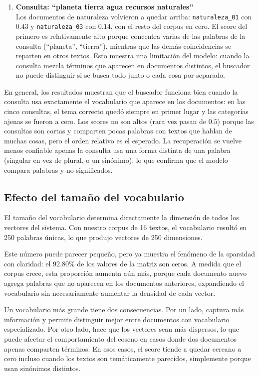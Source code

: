 \documentclass[12pt,a4paper]{article}
\begin{document}
\begin{enumerate}
    \item \textbf{Consulta: ``planeta tierra agua recursos naturales''} \\
    Los documentos de naturaleza volvieron a quedar arriba: \texttt{naturaleza\_01} con $0.43$ y \texttt{naturaleza\_03} con $0.14$, con el resto del corpus en cero. El score del primero es relativamente alto porque concentra varias de las palabras de la consulta (``planeta'', ``tierra''), mientras que las demás coincidencias se reparten en otros textos. Esto muestra una limitación del modelo: cuando la consulta mezcla términos que aparecen en documentos distintos, el buscador no puede distinguir si se busca todo junto o cada cosa por separado.

\end{enumerate}

En general, los resultados muestran que el buscador funciona bien cuando la consulta usa exactamente el vocabulario que aparece en los documentos: en las cinco consultas, el tema correcto quedó siempre en primer lugar y las categorías ajenas se fueron a cero. Los scores no son altos (rara vez pasan de $0.5$) porque las consultas son cortas y comparten pocas palabras con textos que hablan de muchas cosas, pero el orden relativo es el esperado. La recuperación se vuelve menos confiable apenas la consulta usa una forma distinta de una palabra (singular en vez de plural, o un sinónimo), lo que confirma que el modelo compara palabras y no significados.

\subsection{Efecto del tamaño del vocabulario}

El tamaño del vocabulario determina directamente la dimensión de todos los vectores del sistema. Con nuestro corpus de 16 textos, el vocabulario resultó en 250 palabras únicas, lo que produjo vectores de 250 dimensiones.

Este número puede parecer pequeño, pero ya muestra el fenómeno de la sparsidad con claridad: el 92.80\% de los valores de la matriz son ceros. A medida que el corpus crece, esta proporción aumenta aún más, porque cada documento nuevo agrega palabras que no aparecen en los documentos anteriores, expandiendo el vocabulario sin necesariamente aumentar la densidad de cada vector.

Un vocabulario más grande tiene dos consecuencias. Por un lado, captura más información y permite distinguir mejor entre documentos con vocabulario especializado. Por otro lado, hace que los vectores sean más dispersos, lo que puede afectar el comportamiento del coseno en casos donde dos documentos apenas comparten términos. En esos casos, el score tiende a quedar cercano a cero incluso cuando los textos son temáticamente parecidos, simplemente porque usan sinónimos distintos.
\end{document}

